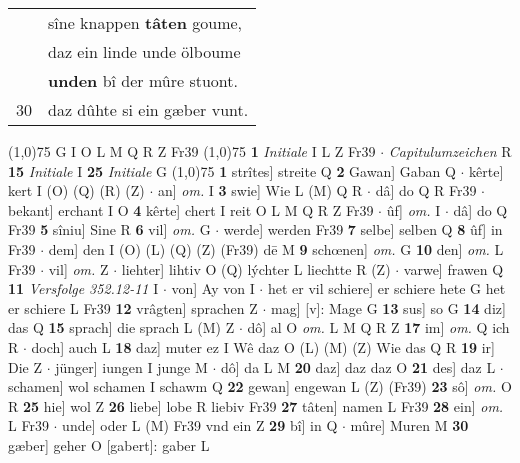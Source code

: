 \documentclass[8pt,a4paper,notitlepage]{article}
\begin{document}
\begin{table}[ht]
\begin{minipage}[t]{0.5\linewidth}
\begin{tabular}{rl}
 & sîne knappen \textbf{tâten} goume,\\ 
 & daz ein linde unde ölboume\\ 
 & \textbf{unden} bî der mûre stuont.\\ 
30 & daz dûhte si ein gæber vunt.\\ 
\end{tabular}
\scriptsize
\line(1,0){75} \newline
G I O L M Q R Z Fr39 \newline
\line(1,0){75} \newline
\textbf{1} \textit{Initiale} I L Z Fr39   $\cdot$ \textit{Capitulumzeichen} R  \textbf{15} \textit{Initiale} I  \textbf{25} \textit{Initiale} G  \newline
\line(1,0){75} \newline
\textbf{1} strîtes] streite Q \textbf{2} Gawan] Gaban Q  $\cdot$ kêrte] kert I (O) (Q) (R) (Z)  $\cdot$ an] \textit{om.} I \textbf{3} swie] Wie L (M) Q R  $\cdot$ dâ] do Q R Fr39  $\cdot$ bekant] erchant I O \textbf{4} kêrte] chert I reit O L M Q R Z Fr39  $\cdot$ ûf] \textit{om.} I  $\cdot$ dâ] do Q Fr39 \textbf{5} sîniu] Sine R \textbf{6} vil] \textit{om.} G  $\cdot$ werde] werden Fr39 \textbf{7} selbe] selben Q \textbf{8} ûf] in Fr39  $\cdot$ dem] den I (O) (L) (Q) (Z) (Fr39) dē M \textbf{9} schœnen] \textit{om.} G \textbf{10} den] \textit{om.} L Fr39  $\cdot$ vil] \textit{om.} Z  $\cdot$ liehter] lihtiv O (Q) lýchter L liechtte R (Z)  $\cdot$ varwe] frawen Q \textbf{11} \textit{Versfolge 352.12-11} I   $\cdot$ von] Ay von I  $\cdot$ het er vil schiere] er schiere hete G het er schiere L Fr39 \textbf{12} vrâgten] sprachen Z  $\cdot$ mag] [v]: Mage G \textbf{13} sus] so G \textbf{14} diz] das Q \textbf{15} sprach] die sprach L (M) Z  $\cdot$ dô] al O \textit{om.} L M Q R Z \textbf{17} im] \textit{om.} Q ich R  $\cdot$ doch] auch L \textbf{18} daz] muter ez I Wê daz O (L) (M) (Z) Wie das Q R \textbf{19} ir] Die Z  $\cdot$ jünger] iungen I junge M  $\cdot$ dô] da L M \textbf{20} daz] daz daz O \textbf{21} des] daz L  $\cdot$ schamen] wol schamen I schawm Q \textbf{22} gewan] engewan L (Z) (Fr39) \textbf{23} sô] \textit{om.} O R \textbf{25} hie] wol Z \textbf{26} liebe] lobe R liebiv Fr39 \textbf{27} tâten] namen L Fr39 \textbf{28} ein] \textit{om.} L Fr39  $\cdot$ unde] oder L (M) Fr39 vnd ein Z \textbf{29} bî] in Q  $\cdot$ mûre] Muren M \textbf{30} gæber] geher O [gabert]: gaber L \newline
\end{minipage}
\hspace{0.5cm}

\end{table}
\end{document}
